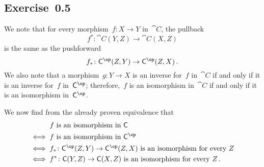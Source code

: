\subsection{Exercise~0.5}
\label{exercise 0.5}

We note that for every morphism~$f \colon X \to Y$ in~$\cat{C}$, the pullback
\[
	f^* \colon \cat{C}(Y, Z) \to \cat{C}(X, Z)
\]
is the same as the pushforward
\[
	f_* \colon \cat{C}^{\op}(Z, Y) \to \cat{C}^{\op}(Z, X) \,.
\]
We also note that a morphism~$g \colon Y \to X$ is an inverse for~$f$ in~$\cat{C}$ if and only if it is an inverse for~$f$ in~$\cat{C}^{\op}$;
therefore,~$f$ is an isomorphism in~$\cat{C}$ if and only if it is an isomorphism in~$\cat{C}^{\op}$.

We now find from the already proven equivalence that
\begin{align*}
	{}&
	\text{$f$ is an isomorphism in~$\cat{C}$}
	\\
	\iff{}&
	\text{$f$ is an isomorphism in~$\cat{C}^{\op}$}
	\\
	\iff{}&
	\text{$f_* \colon \cat{C}^{\op}(Z, Y) \to \cat{C}^{\op}(Z, X)$ is an isomorphism for every~$Z$}
	\\
	\iff{}&
	\text{$f^* \colon \cat{C}(Y, Z) \to \cat{C}(X, Z)$ is an isomorphism for every~$Z$} \,.
\end{align*}
